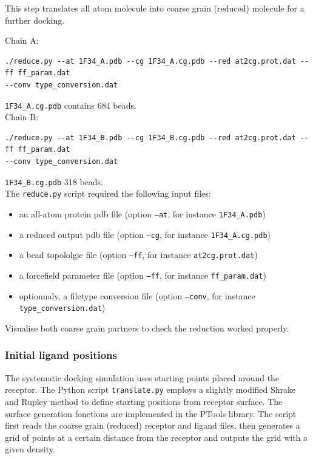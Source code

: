 \documentclass[12pt,a4paper]{article}
\begin{document}
This step translates all atom molecule into coarse grain (reduced) molecule for a further docking. 

Chain A: 
\begin{verbatim}
./reduce.py --at 1F34_A.pdb --cg 1F34_A.cg.pdb --red at2cg.prot.dat --ff ff_param.dat 
--conv type_conversion.dat 
\end{verbatim}
{\tt 1F34\_A.cg.pdb} contains 684 beads.\\

Chain B:
\begin{verbatim}
./reduce.py --at 1F34_B.pdb --cg 1F34_B.cg.pdb --red at2cg.prot.dat --ff ff_param.dat 
--conv type_conversion.dat 
\end{verbatim}
{\tt 1F34\_B.cg.pdb} 318 beads. \\

The {\tt reduce.py} script required the following input files:

\begin{itemize}
\item an all-atom protein pdb file (option {\tt --at}, for instance {\tt 1F34\_A.pdb})
\item a reduced output pdb file (option {\tt --cg}, for instance {\tt 1F34\_A.cg.pdb})
\item a bead topololgie file (option {\tt --ff}, for instance {\tt at2cg.prot.dat})
\item a forcefield parameter file (option {\tt --ff}, for instance {\tt ff\_param.dat})
\item optionnaly, a filetype conversion file (option {\tt --conv}, for instance {\tt type\_conversion.dat})
\end{itemize}

Visualise both coarse grain partners to check the reduction worked properly.



\subsubsection{Initial ligand positions}

The systematic docking simulation uses starting points placed around the
receptor.  The Python script {\tt translate.py} employs a slightly modified
Shrake and Rupley \cite{shrake1973} method to define starting positions
from receptor surface.  The surface generation fonctions are implemented in
the PTools library. The script first reads the coarse grain (reduced)
receptor and ligand files, then generates a grid of points at a certain
distance from the receptor and outputs the grid with a given density.
\end{document}
